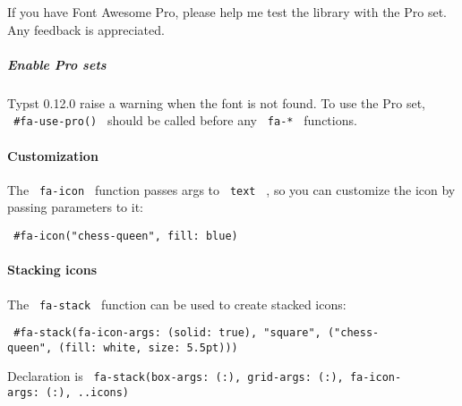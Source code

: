 If you have Font Awesome Pro, please help me test the library with the
Pro set. Any feedback is appreciated.

\subparagraph{Enable Pro sets}\label{enable-pro-sets}

Typst 0.12.0 raise a warning when the font is not found. To use the Pro
set, \texttt{\ \#fa-use-pro()\ } should be called before any
\texttt{\ fa-*\ } functions.

\begin{Shaded}
\begin{Highlighting}[]

\end{Highlighting}
\end{Shaded}

\paragraph{Customization}\label{customization}

The \texttt{\ fa-icon\ } function passes args to \texttt{\ text\ } , so
you can customize the icon by passing parameters to it:

\texttt{\ \#fa-icon("chess-queen",\ fill:\ blue)\ }

\paragraph{Stacking icons}\label{stacking-icons}

The \texttt{\ fa-stack\ } function can be used to create stacked icons:

\texttt{\ \#fa-stack(fa-icon-args:\ (solid:\ true),\ "square",\ ("chess-queen",\ (fill:\ white,\ size:\ 5.5pt)))\ }

Declaration is
\texttt{\ fa-stack(box-args:\ (:),\ grid-args:\ (:),\ fa-icon-args:\ (:),\ ..icons)\ }

